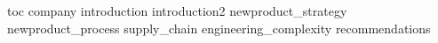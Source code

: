 \documentclass[unknownkeysallowed]{beamer}
\begin{document}

\begin{frame}
  \titlepage
\end{frame}

{toc}
{company}
{introduction}
{introduction2}
{newproduct_strategy}
{newproduct_process}
{supply_chain}
{engineering_complexity}
{recommendations}



\begin{frame}[allowframebreaks]

  \printbibliography

\end{frame}


\appendix
\end{document}

